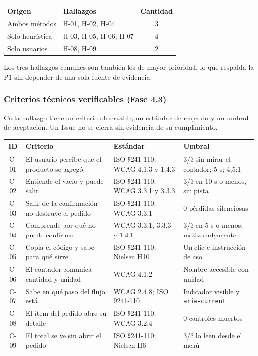 \documentclass{article}
\begin{document}
\begin{center}
\small
\begin{tabular}{|p{3.2cm}|p{8.4cm}|c|}
\hline
\textbf{Origen} & \textbf{Hallazgos} & \textbf{Cantidad} \\
\hline
Ambos métodos & H-01, H-02, H-04 & 3 \\
\hline
Solo heurística & H-03, H-05, H-06, H-07 & 4 \\
\hline
Solo usuarios & H-08, H-09 & 2 \\
\hline
\end{tabular}
\end{center}

Los tres hallazgos comunes son también los de mayor prioridad, lo que respalda la P1 sin depender de una sola fuente de evidencia.

\subsubsection{Criterios técnicos verificables (Fase 4.3)}
Cada hallazgo tiene un criterio observable, un estándar de respaldo y un umbral de aceptación. Un Issue no se cierra sin evidencia de su cumplimiento.

\begin{center}
\scriptsize
\begin{tabular}{|c|p{4.3cm}|p{4.6cm}|p{4.2cm}|}
\hline
\textbf{ID} & \textbf{Criterio} & \textbf{Estándar} & \textbf{Umbral} \\
\hline
C-01 & El usuario percibe que el producto se agregó & ISO 9241-110; WCAG 4.1.3 y 1.4.3 & 3/3 sin mirar el contador; 5 s; 4,5:1 \\
\hline
C-02 & Entiende el vacío y puede salir & ISO 9241-110; WCAG 3.3.1 y 3.3.3 & 3/3 en 10 s o menos, sin pista \\
\hline
C-03 & Salir de la confirmación no destruye el pedido & ISO 9241-110; WCAG 3.3.1 & 0 pérdidas silenciosas \\
\hline
C-04 & Comprende por qué no puede confirmar & WCAG 3.3.1, 3.3.3 y 1.4.1 & 3/3 en 5 s o menos; motivo adyacente \\
\hline
C-05 & Copia el código y sabe para qué sirve & ISO 9241-110; Nielsen H10 & Un clic e instrucción de uso \\
\hline
C-06 & El contador comunica cantidad y unidad & WCAG 4.1.2 & Nombre accesible con unidad \\
\hline
C-07 & Sabe en qué paso del flujo está & WCAG 2.4.8; ISO 9241-110 & Indicador visible y \texttt{aria-current} \\
\hline
C-08 & El ítem del pedido abre su detalle & ISO 9241-110; WCAG 3.2.4 & 0 controles muertos \\
\hline
C-09 & El total se ve sin abrir el pedido & ISO 9241-110; Nielsen H6 & 3/3 lo leen desde el menú \\
\hline
\end{tabular}
\end{center}
\end{document}
